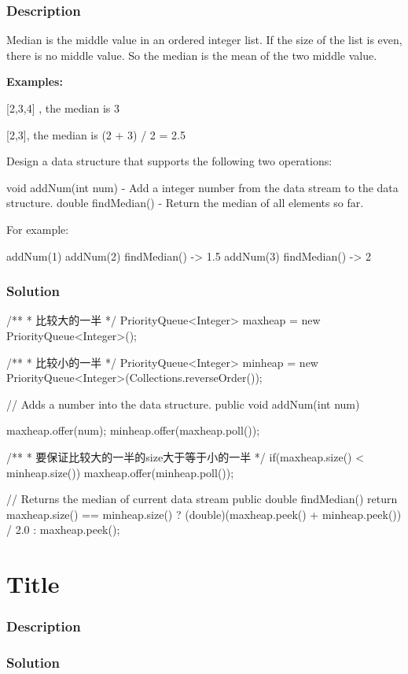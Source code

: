 \subsubsection{Description}
Median is the middle value in an ordered integer list. If the size of the list is even, there is no middle value. So the median is the mean of the two middle value.

\textbf{Examples:}

[2,3,4] , the median is 3

[2,3], the median is (2 + 3) / 2 = 2.5

Design a data structure that supports the following two operations:

void addNum(int num) - Add a integer number from the data stream to the data structure.
double findMedian() - Return the median of all elements so far.

For example:
\begin{Code}
addNum(1)
addNum(2)
findMedian() -> 1.5
addNum(3)
findMedian() -> 2
\end{Code}

\subsubsection{Solution}

\begin{Code}
/**
 * 比较大的一半
 */
PriorityQueue<Integer> maxheap = new PriorityQueue<Integer>();

/**
 * 比较小的一半
 */
PriorityQueue<Integer> minheap = new PriorityQueue<Integer>(Collections.reverseOrder());

// Adds a number into the data structure.
public void addNum(int num) {
    maxheap.offer(num);
    minheap.offer(maxheap.poll());

    /**
     * 要保证比较大的一半的size大于等于小的一半
     */
    if(maxheap.size() < minheap.size()){
        maxheap.offer(minheap.poll());
    }
}

// Returns the median of current data stream
public double findMedian() {
    return maxheap.size() == minheap.size() ?
        (double)(maxheap.peek() + minheap.peek()) / 2.0 : maxheap.peek();
}
\end{Code}

\newpage

\section{Title} %

\subsubsection{Description}

\subsubsection{Solution}

\begin{Code}

\end{Code}

\newpage
